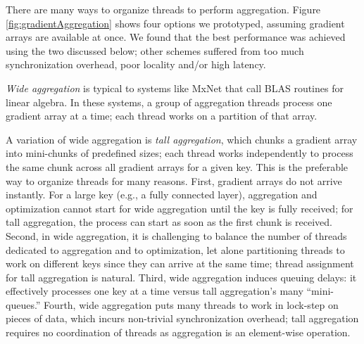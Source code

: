 There are many ways to organize threads to perform aggregation.
Figure \ref{fig:gradientAggregation} shows four options we prototyped, assuming gradient arrays are available at once. We found that the best performance was achieved using the two discussed below; other schemes suffered from too much synchronization overhead, poor locality and/or high latency.

\textit{Wide aggregation} is typical to systems like MxNet that call BLAS routines for linear algebra. In these systems, a group of aggregation threads process one gradient array at a time; each thread works on a partition of that array. 

A variation of wide aggregation is \textit{tall aggregation}, which chunks a gradient array into mini-chunks of predefined sizes; each thread works independently to process the same chunk across all gradient arrays for a given key. This is the preferable way to organize threads for many reasons.
First, gradient arrays do not arrive instantly. For a large key (e.g., a fully connected layer), aggregation and optimization cannot start for wide aggregation until the key is fully received; for tall aggregation, the process can start as soon as the first chunk is received.
Second, in wide aggregation, it is challenging to balance the number of threads dedicated to aggregation and to optimization, let alone partitioning threads to work on different keys since they can arrive at the same time; %
thread assignment for tall aggregation is natural.
Third, wide aggregation induces queuing delays: it effectively processes one key at a time versus tall aggregation's many ``mini-queues.''
Fourth, wide aggregation puts many threads to work in lock-step on pieces of data, which incurs non-trivial synchronization overhead; tall aggregation requires no coordination of threads as aggregation is an element-wise operation.



